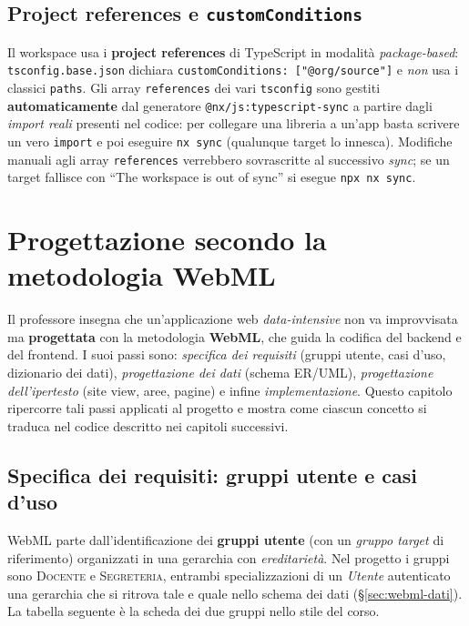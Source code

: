\documentclass[11pt,a4paper,oneside]{report}
\newcommand{\code}[1]{\texttt{\small #1}}
\newcommand{\file}[1]{\texttt{\small #1}}
\begin{document}
\section{Project references e \texttt{customConditions}}
Il workspace usa i \textbf{project references} di TypeScript in modalità
\emph{package-based}: \file{tsconfig.base.json} dichiara
\code{customConditions: ["@org/source"]} e \emph{non} usa i classici
\code{paths}. Gli array \code{references} dei vari \file{tsconfig} sono gestiti
\textbf{automaticamente} dal generatore \code{@nx/js:typescript-sync} a partire
dagli \emph{import reali} presenti nel codice: per collegare una libreria a
un'app basta scrivere un vero \code{import} e poi eseguire \code{nx sync}
(qualunque target lo innesca). Modifiche manuali agli array \code{references}
verrebbero sovrascritte al successivo \emph{sync}; se un target fallisce con
``The workspace is out of sync'' si esegue \code{npx nx sync}.

\chapter{Progettazione secondo la metodologia WebML}
\label{cap:webml}

Il professore insegna che un'applicazione web \emph{data-intensive} non va
improvvisata ma \textbf{progettata} con la metodologia \textbf{WebML}, che guida
la codifica del backend e del frontend. I suoi passi sono: \emph{specifica dei
requisiti} (gruppi utente, casi d'uso, dizionario dei dati), \emph{progettazione
dei dati} (schema ER/UML), \emph{progettazione dell'ipertesto} (site view, aree,
pagine) e infine \emph{implementazione}. Questo capitolo ripercorre tali passi
applicati al progetto e mostra come ciascun concetto si traduca nel codice
descritto nei capitoli successivi.

\section{Specifica dei requisiti: gruppi utente e casi d'uso}
WebML parte dall'identificazione dei \textbf{gruppi utente} (con un \emph{gruppo
target} di riferimento) organizzati in una gerarchia con \emph{ereditarietà}. Nel
progetto i gruppi sono \textsc{Docente} e \textsc{Segreteria}, entrambi
specializzazioni di un \emph{Utente} autenticato \textemdash{} una gerarchia che
si ritrova tale e quale nello schema dei dati (\S\ref{sec:webml-dati}). La
tabella seguente è la scheda dei due gruppi nello stile del corso.
\end{document}
